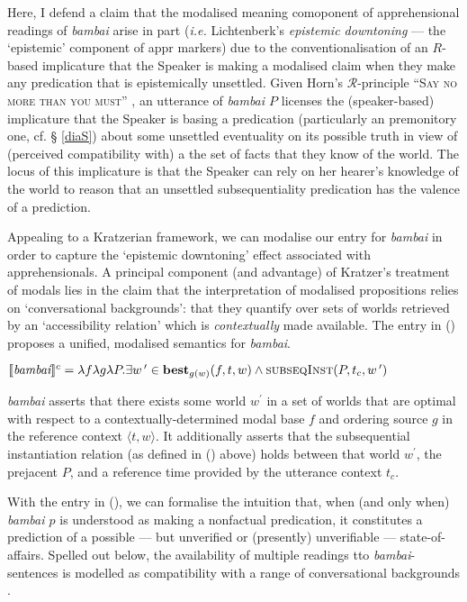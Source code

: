 \documentclass[11pt]{article}
\providecommand{\denote}[2][]{\ensuremath{\llbracket{#2}\rrbracket^{#1}}}
\begin{document}
Here, I defend a claim that the modalised meaning comoponent of apprehensional readings of \textit{bambai} arise in part (\textit{i.e.} Lichtenberk's \textit{epistemic downtoning} --- the `epistemic' component of {\sc appr} markers) due to the conventionalisation of an $R$-based implicature that the Speaker is making a modalised claim when they make any predication that is epistemically unsettled. Given Horn's $ \mathcal R $-principle \textsc{``Say no more than you must''} \citeyearpar[13]{Horn1984}, an utterance of \textit{bambai $P$} licenses the (speaker-based) implicature that the Speaker is basing a predication (particularly an premonitory one, cf. § \ref{diaS}) about some unsettled eventuality on its possible truth in view of (perceived compatibility with) a the set of facts that they know of the world. The locus of this implicature is that the Speaker can rely on her hearer's knowledge of the world to reason that an unsettled subsequentiality predication has the valence of a prediction.


Appealing to a Kratzerian framework, we can modalise our entry for \textit{bambai} in order to capture the `epistemic downtoning' effect associated with apprehensionals. A principal component (and advantage) of Kratzer's treatment of modals \citeyearpar{Kratzer1977,Kratzer1981,Kratzer2012} lies in the claim that the interpretation of modalised propositions relies on `conversational backgrounds': that they quantify over sets of worlds retrieved by an `accessibility relation' which is \textit{contextually} made available. The entry in (\nextx) proposes a unified, modalised semantics for \textit{bambai}.

\pex $\denote[c]{\textit{bambai}}=\lambda f\lambda g\lambda P.\exists w\,^\prime\in\textbf{best}_{g(w)}(f,t,w)\wedge\text{{\sc subseqInst}}(P,t_c,w\,^\prime)$

\textit{bambai} asserts that there exists some world $w^\prime$ in a set of worlds that are optimal with respect to a contextually-determined modal base $f$ and ordering source $g$ in the reference context $\langle t,w\rangle$. It additionally asserts that the {\sc subsequential instantiation} relation (as defined in () above) holds between that world $w^\prime$, the prejacent $P$, and a reference time provided by the utterance context $t_c$.

\xe


With the entry in (\lastx), we can formalise the intuition that, when (and only when) \textit{bambai $p$} is understood as making a nonfactual predication, it constitutes a prediction of a possible --- but unverified or (presently) unverifiable --- state-of-affairs. Spelled out below, the availability of multiple readings tto \textit{bambai}-sentences is modelled as compatibility with a range of conversational backgrounds \citep[\textit{cf.}][55\textit{ff}]{Kratzer2012}.
\end{document}
